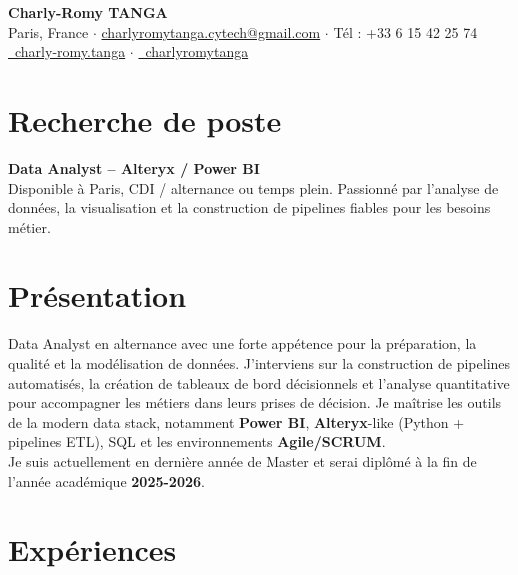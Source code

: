 \documentclass[10pt, letterpaper]{article}
\begin{document}
\begin{center}
    {\Large \textbf{Charly-Romy TANGA}}\\[3pt]
    {\small Paris, France \quad$\cdot$\quad 
    \href{mailto:charlyromytanga.cytech@gmail.com}{charlyromytanga.cytech@gmail.com} \quad$\cdot$\quad
    Tél : +33 6 15 42 25 74}\\[3pt]
    \href{https://linkedin.com/in/charly-romy.tanga}{\faLinkedinIn\ charly-romy.tanga} \quad$\cdot$\quad
    \href{https://github.com/charlyromytanga}{\faGithub\ charlyromytanga}
\end{center}

\vspace{0.2cm}

\section*{Recherche de poste}
\textbf{Data Analyst – Alteryx / Power BI} \\
Disponible à Paris, CDI / alternance ou temps plein. Passionné par l'analyse de données, la visualisation et la construction de pipelines fiables pour les besoins métier.

\section*{Présentation}
Data Analyst en alternance avec une forte appétence pour la préparation, la qualité et la modélisation de données. J’interviens sur la construction de pipelines automatisés, la création de tableaux de bord décisionnels et l’analyse quantitative pour accompagner les métiers dans leurs prises de décision. Je maîtrise les outils de la modern data stack, notamment \textbf{Power BI}, \textbf{Alteryx}-like (Python + pipelines ETL), SQL et les environnements \textbf{Agile/SCRUM}. \\
Je suis actuellement en dernière année de Master et serai diplômé à la fin de l'année académique \textbf{2025-2026}.

\section*{Expériences}
\end{document}
